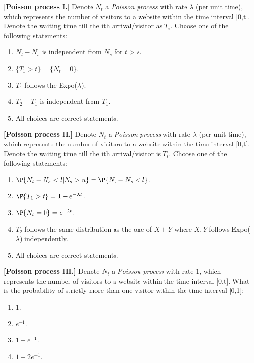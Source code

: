 \documentclass[poll_tutorial_format]{subfiles}
\begin{document}
	
	\begin{exercise}
	\textbf{[Poisson process I.]} Denote $N_t$ a \textit{Poisson process} with rate $\lambda$ (per unit time), which represents the number of visitors to a website within the time interval [0,t]. Denote the waiting time till the ith arrival/visitor as $T_i$. Choose one of the following statements: 
		\begin{enumerate}
			\item $N_t-N_s$ is independent from $N_s$ for $t>s$. 
			\item $\{T_1> t\}=\{N_t=0\}$.
			\item $T_1$ follows the Expo($\lambda$).
			\item $T_2-T_1$ is independent from $T_1$. 
			\item All choices are correct statements.
		\end{enumerate}
	\end{exercise}
	
	
	\begin{exercise}
	\textbf{[Poisson process II.]} Denote $N_t$ a \textit{Poisson process} with rate $\lambda$ (per unit time), which represents the number of visitors to a website within the time interval [0,t]. Denote the waiting time till the ith arrival/visitor is $T_i$. Choose one of the following statements: 
	\begin{enumerate}
		\item $\P{N_t-N_s <l|N_s>u}=\P{N_t-N_s <l}$. 
		\item $\P{T_1> t}= 1-e^{-\lambda t}$.
		\item $\P{N_t=0} = e^{-\lambda t}$.
		\item $T_2$ follows the same distribution as the one of $X+Y$ where $X,Y$ follows Expo($\lambda$) independently.
					\item All choices are correct statements.
	\end{enumerate}
\end{exercise}
	
	

	\begin{exercise}
	\textbf{[Poisson process III.]} Denote $N_t$ a \textit{Poisson process} with rate $1$, which represents the number of visitors to a website within the time interval [0,t]. What is the probability of strictly more than one visitor within the time interval [0,1]: 
	\begin{enumerate}
		\item 1.
		\item $e^{-1}$.
		\item $1-e^{-1}$.
		\item $1-2e^{-1}$.
 	\end{enumerate}
\end{exercise}
\end{document}
